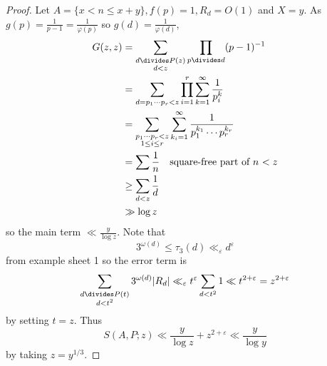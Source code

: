 \documentclass[a4paper]{article}
\begin{document}
\begin{proof}
  Let \(A = \{x < n \leq x + y\}, f(p) = 1, R_d = O(1)\) and \(X = y\). As \(g(p) = \frac{1}{p - 1} = \frac{1}{\varphi(p)}\) so \(g(d) = \frac{1}{\varphi(d)}\),
  \begin{align*}
    G(z, z)
    &= \sum_{\substack{d \divides P(z) \\ d < z}} \prod_{p \divides d} (p - 1)^{-1} \\
    &= \sum_{d = p_1 \cdots p_r < z} \prod_{i = 1}^r \sum_{k = 1}^\infty \frac{1}{p_i^k} \\
    &= \sum_{\substack{p_1 \cdots p_r < z \\ 1 \leq i \leq r}} \sum_{k_i = 1}^\infty \frac{1}{p_1^{k_1} \cdots p_r^{k_r}} \\
    &= \sum \frac{1}{n} \quad \text{square-free part of \(n\) \(< z\)} \\
    &\geq \sum_{d < z} \frac{1}{d} \\
    &\gg \log z
  \end{align*}
  so the main term \(\ll \frac{y}{\log z}\). Note that
  \[
    3^{\omega(d)} \leq \tau_3(d) \ll_\varepsilon d^\varepsilon
  \]
  from example sheet 1 so the error term is
  \[
    \sum_{\substack{d \divides P(t) \\ d < t^2}} 3^{\omega(d)} |R_d|
    \ll_\varepsilon t^\varepsilon \sum_{d < t^2} 1
    \ll t^{2 + \varepsilon} = z^{2 + \varepsilon}
  \]
  by setting \(t = z\). Thus
  \[
    S(A, P; z) \ll \frac{y}{\log z} + z^{2 + \varepsilon} \ll \frac{y}{\log y}
  \]
  by taking \(z = y^{1/3}\).
\end{proof}
\end{document}
